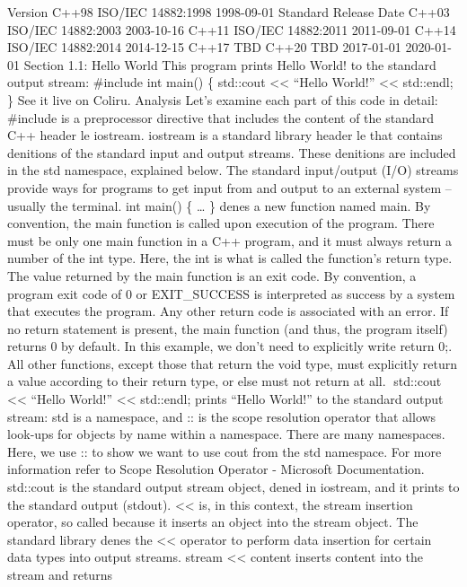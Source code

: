Version C++98 ISO/IEC 14882:1998 1998-09-01 Standard Release Date C++03
ISO/IEC 14882:2003 2003-10-16 C++11 ISO/IEC 14882:2011 2011-09-01 C++14
ISO/IEC 14882:2014 2014-12-15 C++17 TBD C++20 TBD 2017-01-01 2020-01-01
Section 1.1: Hello World This program prints Hello World! to the
standard output stream: \#include int main() \{ std::cout
\textless\textless{} ``Hello World!'' \textless\textless{} std::endl; \}
See it live on Coliru. Analysis Let's examine each part of this code in
detail: \#include is a preprocessor directive that includes the content
of the standard C++ header le iostream. iostream is a standard library
header le that contains denitions of the standard input and output
streams. These denitions are included in the std namespace, explained
below. The standard input/output (I/O) streams provide ways for programs
to get input from and output to an external system -- usually the
terminal. int main() \{ \ldots{} \} denes a new function named main. By
convention, the main function is called upon execution of the program.
There must be only one main function in a C++ program, and it must
always return a number of the int type. Here, the int is what is called
the function's return type. The value returned by the main function is
an exit code. By convention, a program exit code of 0 or EXIT\_SUCCESS
is interpreted as success by a system that executes the program. Any
other return code is associated with an error. If no return statement is
present, the main function (and thus, the program itself) returns 0 by
default. In this example, we don't need to explicitly write return 0;.
All other functions, except those that return the void type, must
explicitly return a value according to their return type, or else must
not return at all. std::cout \textless\textless{} ``Hello World!''
\textless\textless{} std::endl; prints ``Hello World!'' to the standard
output stream: std is a namespace, and :: is the scope resolution
operator that allows look-ups for objects by name within a namespace.
There are many namespaces. Here, we use :: to show we want to use cout
from the std namespace. For more information refer to Scope Resolution
Operator - Microsoft Documentation. std::cout is the standard output
stream object, dened in iostream, and it prints to the standard output
(stdout). \textless\textless{} is, in this context, the stream insertion
operator, so called because it inserts an object into the stream object.
The standard library denes the \textless\textless{} operator to perform
data insertion for certain data types into output streams. stream
\textless\textless{} content inserts content into the stream and returns
